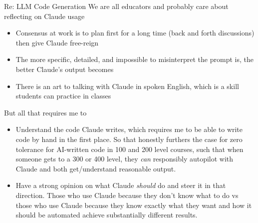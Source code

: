 \begin{frame}{Re: LLM Code Generation}
  We are all educators and probably care about reflecting on Claude usage
  \begin{itemize}[<+>]
    \item Consensus at work is to plan first for a long time (back and forth discussions) then give Claude free-reign
    \item The more specific, detailed, and impossible to misinterpret the prompt is, the better Claude's output becomes
    \item There is an art to talking with Claude in spoken English, which is a skill students can practice in classes
  \end{itemize}
  But all that requires me to
  \begin{itemize}[<+>]
    \item Understand the code Claude writes, which requires me to be able to write code by hand in the first place. So that honestly furthers the case for zero tolerance for AI-written code in 100 and 200 level courses, such that when someone gets to a 300 or 400 level, they \textit{can} responsibly autopilot with Claude and both get/understand reasonable output.
    \item Have a strong opinion on what Claude \textit{should} do and steer it in that direction. Those who use Claude because they don't know what to do vs those who use Claude because they know exactly what they want and how it should be automated achieve substantially different results.
  \end{itemize}
\end{frame}

